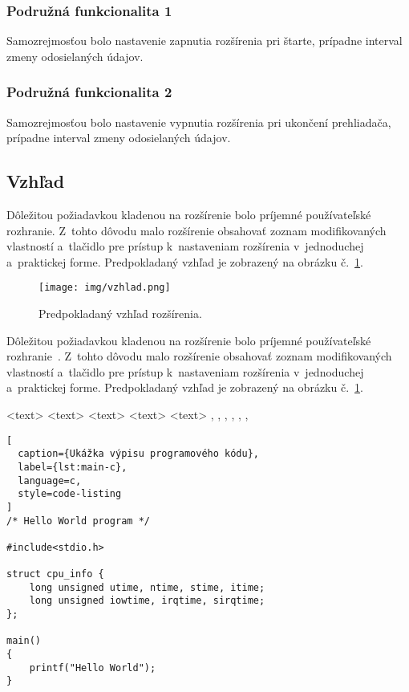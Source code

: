 \subsubsection{Podružná funkcionalita 1}
Samozrejmosťou bolo nastavenie zapnutia rozšírenia pri štarte, prípadne interval zmeny odosielaných údajov.

\subsubsection{Podružná funkcionalita 2}
Samozrejmosťou bolo nastavenie vypnutia rozšírenia pri ukončení prehliadača, prípadne interval zmeny odosielaných údajov.

\subsection{Vzhľad}
Dôležitou požiadavkou kladenou na rozšírenie bolo príjemné používateľské rozhranie. Z~tohto dôvodu malo rozšírenie obsahovať zoznam modifikovaných vlastností a~tlačidlo pre prístup k~nastaveniam rozšírenia v~jednoduchej a~praktickej forme. Predpokladaný vzhľad je zobrazený na obrázku č.~\ref{vzhladobr}.
\begin{figure}[htbp]
  \centering
  \texttt{[image: img/vzhlad.png]}
  \caption{Predpokladaný vzhľad rozšírenia.}
  \label{vzhladobr}
\end{figure}	 
Dôležitou požiadavkou kladenou na rozšírenie bolo príjemné používateľské rozhranie~\cite{t00}. Z~tohto dôvodu malo rozšírenie obsahovať zoznam modifikovaných vlastností a~tlačidlo pre prístup k~nastaveniam rozšírenia v~jednoduchej a~praktickej forme. Predpokladaný vzhľad je zobrazený na obrázku č.~\ref{vzhladobr}.

\begin{algorithm}
\scriptsize
\begin{algorithmic}
 \STATE <text>
   \ELSE {} \ENDIF
     \ENDIF
   \ENDFOR
   \ENDFOR
   \ENDFOR
   \ENDWHILE
 \REPEAT {} 
 \LOOP {} \ENDLOOP
 \REQUIRE <text>
 \ENSURE <text>
 \RETURN <text>
 \PRINT <text>
 \AND, \OR, \XOR, \NOT, \TO, \TRUE, \FALSE
\end{algorithmic}
\caption{Ukážka príkazov pre algorithmic}  
\label{alg:preview}  
\end{algorithm}

\begin{lstlisting}[
  caption={Ukážka výpisu programového kódu},
  label={lst:main-c},
  language=c,
  style=code-listing
]
/* Hello World program */

#include<stdio.h>

struct cpu_info {
    long unsigned utime, ntime, stime, itime;
    long unsigned iowtime, irqtime, sirqtime;
};

main()
{
    printf("Hello World");
}
\end{lstlisting}
